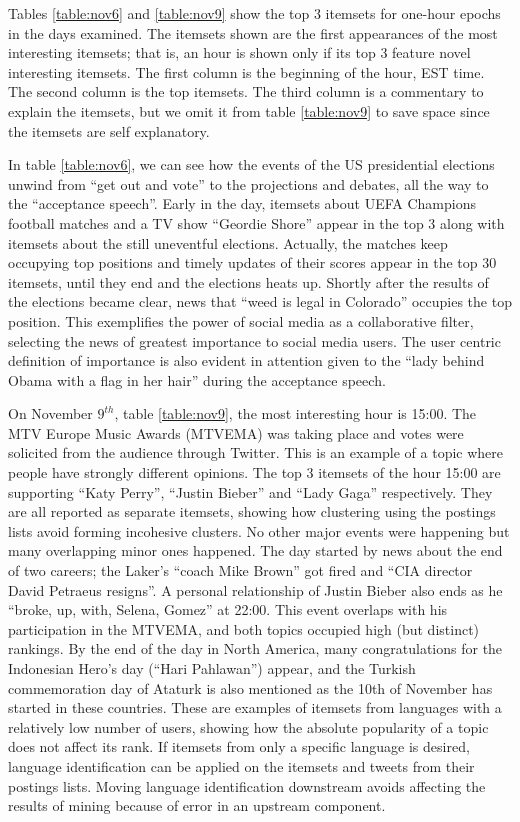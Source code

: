\documentclass[letterpaper,12pt,titlepage,oneside,final]{book}
\begin{document}
Tables \ref{table:nov6} and \ref{table:nov9}  show the top 3 itemsets for
one-hour epochs in the days examined.
The itemsets shown are the first appearances of the most interesting itemsets;
that is, an hour is shown only if its top 3 feature novel interesting itemsets. The first column is the beginning of the hour, EST time.
The second column is the top itemsets.
The third column is a commentary to explain the itemsets,
but we omit it from table \ref{table:nov9} to save space since the itemsets are self explanatory.

In table \ref{table:nov6}, we can see how the events of the US presidential
elections  unwind from ``get out and vote'' to the projections and debates,
all the way to the ``acceptance speech''.
Early in the day, itemsets about UEFA Champions football matches and a TV show
``Geordie Shore'' appear in the top 3 along with itemsets about the still
uneventful elections.
Actually, the matches keep occupying top positions and timely updates of their
scores appear in the top 30 itemsets, until they end and the elections
heats up.
Shortly after the results of the elections became clear, news that
``weed is legal in Colorado'' occupies the top position.
This exemplifies the power of social media as a collaborative filter,
selecting the news of greatest importance to social media users.
The user centric definition of importance is also evident in attention
given to the ``lady behind Obama  with a flag in her hair'' during the
acceptance speech. 

On November $9^{th}$, table \ref{table:nov9}, the most interesting hour is
15:00.
The MTV Europe Music Awards (MTVEMA) was taking place and votes were solicited
from the audience through Twitter.
This is an example of a topic where people have strongly different opinions.
The top 3 itemsets of the hour 15:00 are supporting ``Katy  Perry'',
``Justin Bieber'' and ``Lady Gaga'' respectively.
They are all reported as separate itemsets, showing how clustering using the
postings lists avoid forming incohesive clusters.
No other major events were happening but many overlapping minor ones happened.
The day started by news about the end of two careers;
the Laker's ``coach Mike Brown'' got fired  and ``CIA director David Petraeus
resigns''.
A personal relationship of Justin Bieber also ends as he
``broke, up, with, Selena, Gomez'' at 22:00.
This event overlaps with his participation in the MTVEMA,
and both topics occupied high (but distinct) rankings. 
By the end of the day in North America, many congratulations for the
Indonesian Hero's day (``Hari Pahlawan'') appear, and the Turkish
commemoration day of Ataturk is also mentioned as the 10th of November has
started in these countries.
These are examples of itemsets from languages with a relatively low number of
users, showing how the absolute popularity of a topic does not affect its rank.
If itemsets from only a specific language is desired,
language identification can be applied on the itemsets and tweets from their
postings lists.
Moving language identification downstream avoids affecting the results of
mining because of error in an upstream component.
\end{document}
